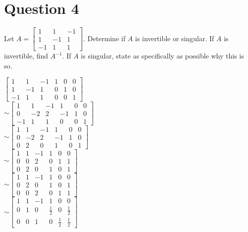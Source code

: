\documentclass{report}
\begin{document}
\section*{Question 4}
\begin{example}
    Let $A = \begin{bmatrix} 1 & 1 & -1 \\ 1 & -1 & 1 \\ -1 & 1 & 1 \end{bmatrix}$. Determine if $A$ is invertible or singular. If $A$ is invertible, find $A^{-1}$. If $A$ is singular, state as specifically as possible why this is so.
\end{example}
$\begin{bmatrix} 
    1 & 1 & -1 & 1 & 0 & 0 \\ 
    1 & -1 & 1 & 0 & 1 & 0 \\ 
    -1 & 1 & 1 & 0 & 0 & 1 
\end{bmatrix}$\\\vspace{3mm}
$\sim \begin{bmatrix} 
    1 & 1 & -1 & 1 & 0 & 0 \\ 
    0 & -2 & 2 & -1 & 1 & 0 \\ 
    -1 & 1 & 1 & 0 & 0 & 1 
\end{bmatrix}$\\\vspace{3mm}
$\sim \begin{bmatrix} 
    1 & 1 & -1 & 1 & 0 & 0 \\ 
    0 & -2 & 2 & -1 & 1 & 0 \\ 
    0 & 2 & 0 & 1 & 0 & 1 
\end{bmatrix}$\\\vspace{3mm}
$\sim \begin{bmatrix} 
    1 & 1 & -1 & 1 & 0 & 0 \\ 
    0 & 0 & 2 & 0 & 1 & 1 \\ 
    0 & 2 & 0 & 1 & 0 & 1 
\end{bmatrix}$\\\vspace{3mm}
$\sim \begin{bmatrix} 
    1 & 1 & -1 & 1 & 0 & 0 \\
    0 & 2 & 0 & 1 & 0 & 1 \\ 
    0 & 0 & 2 & 0 & 1 & 1 
\end{bmatrix}$\\\vspace{3mm}
$\sim \begin{bmatrix} 
    1 & 1 & -1 & 1 & 0 & 0 \\
    0 & 1 & 0 & \frac{1}{2} & 0 & \frac{1}{2} \\ 
    0 & 0 & 1 & 0 & \frac{1}{2} & \frac{1}{2} 
\end{bmatrix}$\\\vspace{3mm}
\end{document}
